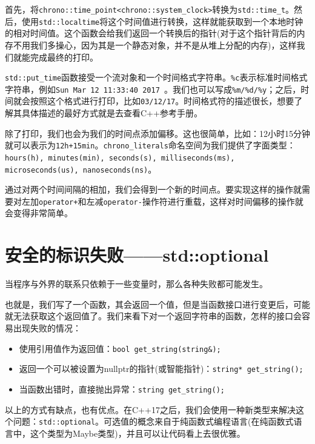 首先，将\texttt{chrono::time\_point<chrono::system\_clock>}转换为\texttt{std::time\_t}。然后，使用\texttt{std::localtime}将这个时间值进行转换，这样就能获取到一个本地时钟的相对时间值。这个函数会给我们返回一个转换后的指针(对于这个指针背后的内存不用我们多操心，因为其是一个静态对象，并不是从堆上分配的内存)，这样我们就能完成最终的打印。

\texttt{std::put\_time}函数接受一个流对象和一个时间格式字符串。\texttt{\%c}表示标准时间格式字符串，例如\texttt{Sun Mar 12 11:33:40 2017 }。我们也可以写成\texttt{\%m/\%d/\%y}；之后，时间就会按照这个格式进行打印，比如\texttt{03/12/17}。时间格式符的描述很长，想要了解其具体描述的最好方式就是去查看C++参考手册。

除了打印，我们也会为我们的时间点添加偏移。这也很简单，比如：12小时15分钟就可以表示为\texttt{12h+15min}。\texttt{chrono\_literals}命名空间为我们提供了字面类型：\texttt{hours(h), minutes(min), seconds(s), milliseconds(ms), microseconds(us), nanoseconds(ns)}。

通过对两个时间间隔的相加，我们会得到一个新的时间点。要实现这样的操作就需要对左加\texttt{operator+}和左减\texttt{operator-}操作符进行重载，这样对时间偏移的操作就会变得非常简单。


\section{安全的标识失败——std::optional}

当程序与外界的联系只依赖于一些变量时，那么各种失败都可能发生。

也就是，我们写了一个函数，其会返回一个值，但是当函数接口进行变更后，可能就无法获取这个返回值了。我们来看下对一个返回字符串的函数，怎样的接口会容易出现失败的情况：

\begin{itemize}
\item 使用引用值作为返回值：\texttt{bool get\_string(string\&);}

\item 返回一个可以被设置为nullptr的指针(或智能指针)：\texttt{string* get\_string();}

\item 当函数出错时，直接抛出异常：\texttt{string get\_string();}

\end{itemize}

以上的方式有缺点，也有优点。在C++17之后，我们会使用一种新类型来解决这个问题：\texttt{std::optional}。可选值的概念来自于纯函数式编程语言(在纯函数式语言中，这个类型为Maybe类型)，并且可以让代码看上去很优雅。

